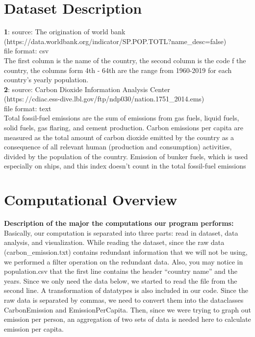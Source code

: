 \documentclass[fontsize=11pt]{article}
\begin{document}
    \section*{Dataset Description} \indent

    \textbf{1}: source: The origination of world bank \\
    (https://data.worldbank.org/indicator/SP.POP.TOTL?name\_desc=false)
    \\
    file format: csv\\
    The first column is the name of the country, the second column is the code f the country,
    the columns form 4th - 64th are the range from 1960-2019 for each country's yearly population.\\

    \textbf{2}: source: Carbon Dioxide Information Analysis Center \\
    (https$://$cdiac.ess-dive.lbl.gov/ftp/ndp030/nation.1751\_2014.ems)
    \\
    file format: text\\
    Total fossil-fuel emissions are the sum of emissions from gas fuels, liquid fuels, solid fuels, gas flaring, and cement production.
    Carbon emissions per capita are measured as the total amount of carbon dioxide emitted
    by the country as a consequence of all relevant human (production and consumption) activities, divided by the population of the country.
    Emission of bunker fuels, which is used especially on ships, and this index doesn't count in the total fossil-fuel emissions

    \vspace{\baselineskip}

    \section*{Computational Overview} \indent

    \textbf{Description of the major the computations our program performs:}
    Basically, our computation is separated into three parts: read in dataset, data analysis, and visualization. While reading the dataset, since the raw data (carbon\_emission.txt) contains redundant information that we will not be using, we performed a filter operation on the redundant data. Also, you may notice in population.csv that the first line contains the header “country name” and the years. Since we only need the data below, we started to read the file from the second line. A transformation of datatypes is also included in our code. Since the raw data is separated by commas, we need to convert them into the dataclasses CarbonEmission and EmissionPerCapita. Then, since we were trying to graph out emission per person, an aggregation of two sets of data is needed here to calculate emission per capita.
\end{document}
